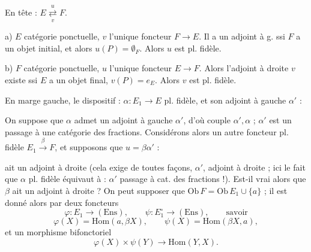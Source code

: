 \documentclass[11pt,a4paper]{article}
\begin{document}
En tête : $E \underset{v}{\overset{u}{\rightleftarrows}} F$.

a) $E$ catégorie ponctuelle, $v$ l'unique foncteur $F \to E$. Il a un
adjoint à g. ssi $F$ a un objet initial, et alors $u(P) = \emptyset_F$.
Alors $u$ est pl. fidèle.

b) $F$ catégorie ponctuelle, $u$ l'unique foncteur $E \to F$. Alors
l'adjoint à droite $v$ existe ssi $E$ a un objet final,
$v(P) = e_E$. Alors $v$ est pl. fidèle.

En marge gauche, le dispositif : $\alpha : E_1 \to E$ pl. fidèle, et son
adjoint à gauche $\alpha'$ :


On suppose que $\alpha$ admet un adjoint à gauche $\alpha'$, d'où couple
$\alpha', \alpha$ ;   $\alpha'$ est
un passage à une catégorie des fractions. Considérons alors un autre
foncteur pl. fidèle $E_1 \xrightarrow{\beta} F$, et supposons que
$u = \beta\alpha'$ :


ait un adjoint à  droite (cela exige de toutes façons,
\ill{} $\alpha'$,  adjoint à droite ; ici le fait
que $\alpha$ pl. fidèle équivaut à : $\alpha'$ passage à cat. des
fractions !). Est-il vrai alors que $\beta$ ait un adjoint à droite ? On
peut supposer que $\mathrm{Ob}\,F = \mathrm{Ob}\,E_1 \cup \{a\}$ ; il est
donné alors par deux foncteurs
\[
\varphi : E_1 \to (\mathrm{Ens}), \qquad
\psi : E_1^{\circ} \to (\mathrm{Ens}), \qquad \text{savoir}
\]
\[
\varphi(X) = \mathrm{Hom}(a, \beta X), \qquad
\psi(X) = \mathrm{Hom}(\beta X, a),
\]
et un morphisme bifonctoriel
\[
\varphi(X) \times \psi(Y) \longrightarrow \mathrm{Hom}(Y, X).
\]
\end{document}
